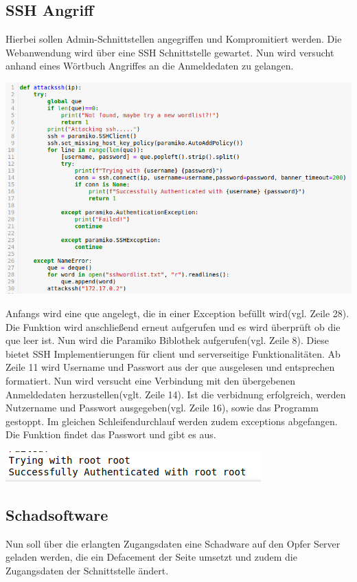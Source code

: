 \documentclass[12pt]{article}
\begin{document}
\subsection{SSH Angriff}
Hierbei sollen Admin-Schnittstellen angegriffen und Kompromitiert werden.
Die Webanwendung wird über eine SSH Schnittstelle gewartet. Nun  wird versucht anhand eines Wörtbuch Angriffes an die Anmeldedaten zu gelangen.
\begin{center}
 \includegraphics[scale=0.5]{data/ssh.png}
\end{center}
Anfangs wird eine que angelegt, die in einer Exception befüllt wird(vgl. Zeile 28). Die Funktion wird anschließend erneut aufgerufen und es wird überprüft ob die que leer ist. Nun wird die Paramiko Biblothek aufgerufen(vgl. Zeile 8). Diese bietet SSH Implementierungen für client und serverseitige Funktionalitäten. Ab Zeile 11 wird Username und Passwort aus der que ausgelesen und entsprechen formatiert. Nun wird versucht eine Verbindung mit den übergebenen Anmeldedaten herzustellen(vglt. Zeile 14). Ist die verbidnung erfolgreich, werden Nutzername und Passwort ausgegeben(vgl. Zeile 16), sowie das Programm gestoppt. Im gleichen Schleifendurchlauf werden zudem exceptions abgefangen. Die Funktion findet das Passwort und gibt es aus.\\
\begin{center}
\includegraphics[scale=0.5]{data/success.png}
\end{center}
\subsection{Schadsoftware}
Nun soll über die erlangten Zugangsdaten eine Schadware auf den Opfer Server geladen werden, die ein Defacement der Seite umsetzt und zudem die Zugangsdaten der Schnittstelle ändert.
\end{document}
